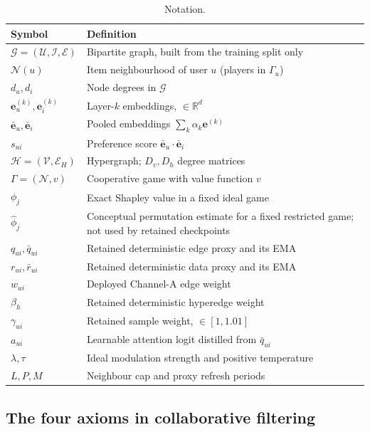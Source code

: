 \documentclass[a4paper,fleqn,longmktitle]{cas-dc}
\begin{document}
\begin{table}[t]
\centering
\caption{Notation.}
\label{tab:notation}
\footnotesize
\begin{tabular}{ll}
\toprule
\textbf{Symbol} & \textbf{Definition} \\
\midrule
$\mathcal{G}=(\mathcal{U},\mathcal{I},\mathcal{E})$ & Bipartite graph, built
from the training split only \\
$\mathcal{N}(u)$ & Item neighbourhood of user $u$ (players in $\Gamma_u$) \\
$d_u, d_i$ & Node degrees in $\mathcal{G}$ \\
$\mathbf{e}^{(k)}_u,\mathbf{e}^{(k)}_i$ & Layer-$k$ embeddings,
$\in\mathbb{R}^{d}$ \\
$\bar{\mathbf{e}}_u,\bar{\mathbf{e}}_i$ & Pooled embeddings
$\sum_{k}\alpha_k\mathbf{e}^{(k)}$ \\
$s_{ui}$ & Preference score
$\bar{\mathbf{e}}_u \cdot \bar{\mathbf{e}}_i$ \\
$\mathcal{H}=(\mathcal{V},\mathcal{E}_H)$ & Hypergraph; $D_v,D_h$ degree
matrices \\
$\Gamma=(\mathcal{N},v)$ & Cooperative game with value function $v$ \\
$\phi_j$ & Exact Shapley value in a fixed ideal game \\
$\hat{\phi}_j$ & Conceptual permutation estimate for a fixed restricted game;
not used by retained checkpoints \\
$q_{ui},\bar q_{ui}$ & Retained deterministic edge proxy and its EMA \\
$r_{ui},\bar r_{ui}$ & Retained deterministic data proxy and its EMA \\
$w_{ui}$ & Deployed Channel-A edge weight \\
$\beta_h$ & Retained deterministic hyperedge weight \\
$\gamma_{ui}$ & Retained sample weight, $\in[1,1.01]$ \\
$a_{ui}$ & Learnable attention logit distilled from $\bar q_{ui}$ \\
$\lambda,\tau$ & Ideal modulation strength and positive temperature \\
$L,P,M$ & Neighbour cap and proxy refresh periods \\
\bottomrule
\end{tabular}
\end{table}

\subsection{The four axioms in collaborative filtering}
\label{sec:axioms}
\end{document}
